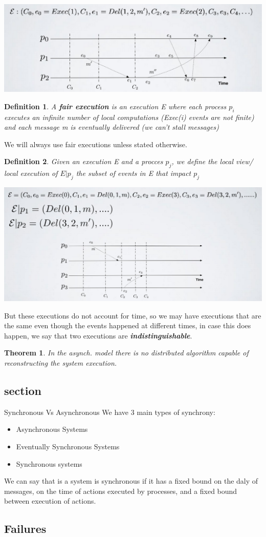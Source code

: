 \documentclass[11pt, a4paper]{article}
\newtheorem{thm}{Theorem}
\newtheorem{defn}{Definition}
\begin{document}
\begin{center}
    \includegraphics[scale=0.5]{img/execgraph.png}
\end{center}
\newpage
\begin{defn}
    A \textbf{fair execution} is an execution E where each process $p_i$ executes an infinite number of local computations (Exec(i) events are not finite) and each message m is eventually delivered (we can't stall messages)
\end{defn}
We will always use fair executions unless stated otherwise.
\begin{defn}
    Given an execution E and a procces $p_j$, we define the local view/ local execution of $E|p_j$ the subset of events in E that impact $p_j$
    \begin{center}
        \includegraphics[scale=0.5]{img/localexec.png}
    \end{center}
\end{defn}
But these executions do not account for time, so we may have executions that are the same even though the events happened at different times, in case this does happen, we say that two executions are \textbf{\textit{indistinguishable}}.
\begin{thm}
In the asynch. model there is no distributed algorithm capable of reconstructing the system execution.
\end{thm}

\subsection{section}{Synchronous Vs Asynchronous}
We have 3 main types of synchrony:
\begin{itemize}
    \item Asynchronous Systems
    \item Eventually Synchronous Systems
    \item Synchronous systems
\end{itemize}
We can say that is a system is synchronous if it has a fixed bound on the daly of messages, on the time of actions executed by processes, and a fixed bound between execution of actions.
\subsection{Failures}
\end{document}
